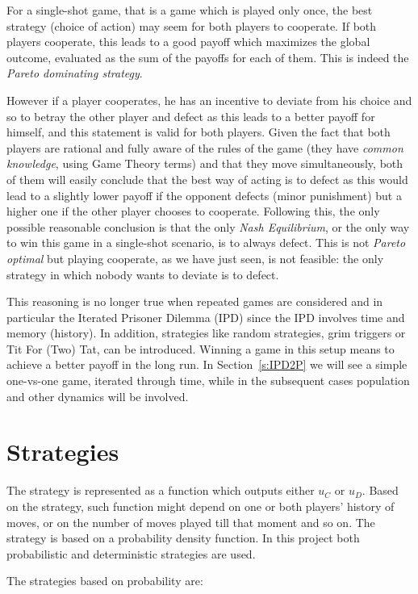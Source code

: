 \documentclass[journal,a4paper,10pt,twoside]{IEEEtran} %
\begin{document}
For a single-shot game, that is a game which is played only once, the best strategy (choice of action) may seem for both players to cooperate. If both players cooperate, this leads to a good payoff which maximizes the global outcome, evaluated as the sum of the payoffs for each of them. This is indeed the \textit{Pareto dominating strategy}.

However if a player cooperates, he has an incentive to deviate from his choice and so to betray the other player and defect as this leads to a better payoff for himself, and this statement is valid for both players. 
Given the fact that both players are rational and fully aware of the rules of the game (they have \textit{common knowledge}, using Game Theory terms) and that they move simultaneously, both of them will easily conclude that the best way of acting is to defect as this would lead to a slightly lower payoff if the opponent defects (minor punishment) but a higher one if the other player chooses to cooperate.
Following this, the only possible reasonable conclusion is that the only \textit{Nash Equilibrium}, or the only way to win this game in a single-shot scenario, is to always defect.
This is not \textit{Pareto optimal} but playing cooperate, as we have just seen, is not feasible: the only strategy in which nobody wants to deviate is to defect.

This reasoning is no longer true when repeated games are considered and in particular the Iterated Prisoner Dilemma (IPD) since the IPD involves time and memory (history). In addition, strategies like random strategies, grim triggers or Tit For (Two) Tat, can be introduced.
Winning a game in this setup means to achieve a better payoff in the long run. In Section~\ref{s:IPD2P} we will see a simple one-vs-one game, iterated through time, while in the subsequent cases population and other dynamics will be involved.

\section{Strategies} \label{s:str}
The strategy is represented as a function which outputs either $u_C$ or $u_D$. Based on the strategy, such function might depend on one or both players' history of moves, or on the number of moves played till that moment and so on.
The strategy is based on a probability density function. In this project both probabilistic and deterministic strategies are used.

The strategies based on probability are:
\end{document}
